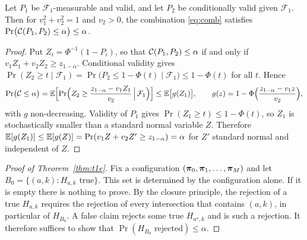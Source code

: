 \begin{appendix}
\begin{lemma}\label{lem:inv}
Let $P_1$ be $\mathcal F_1$-measurable and valid, and let $P_2$ be conditionally valid given $\mathcal F_1$. Then for $v_1^2+v_2^2=1$ and $v_2>0$, the combination \eqref{eq:comb} satisfies $\mathrm{Pr}\big(\mathcal{C}(P_1,P_2)\le\alpha\big)\le\alpha$.
\end{lemma}

\begin{proof}
Put $Z_i=\Phi^{-1}(1-P_i)$, so that $\mathcal{C}(P_1,P_2)\le\alpha$ if and only if $v_1Z_1+v_2Z_2\ge z_{1-\alpha}$. Conditional validity gives $\Pr(Z_2\ge t\mid\mathcal F_1)=\Pr\big(P_2\le1-\Phi(t)\mid\mathcal F_1\big)\le1-\Phi(t)$ for all $t$. Hence
\begin{equation*}
\mathrm{Pr}\big(\mathcal{C}\le\alpha\big)=\mathbb{E}\Big[\mathrm{Pr}\Big(Z_2\ge\frac{z_{1-\alpha}-v_1Z_1}{v_2}\,\Big|\,\mathcal F_1\Big)\Big]\le\mathbb{E}\big[g(Z_1)\big],\qquad g(z)=1-\Phi\Big(\frac{z_{1-\alpha}-v_1z}{v_2}\Big),
\end{equation*}
with $g$ non-decreasing. Validity of $P_1$ gives $\Pr(Z_1\ge t)\le1-\Phi(t)$, so $Z_1$ is stochastically smaller than a standard normal variable $Z$. Therefore $\mathbb{E}[g(Z_1)]\le\mathbb{E}[g(Z)]=\mathrm{Pr}(v_1Z+v_2Z'\ge z_{1-\alpha})=\alpha$ for $Z'$ standard normal and independent of $Z$.
\end{proof}

\begin{proof}[Proof of Theorem~\ref{thm:t1e}]
Fix a configuration $(\bm{\pi}_0,\bm{\pi}_1,\dots,\bm{\pi}_M)$ and let $B_0=\{(a,k):H_{a,k}\text{ true}\}$. This set is determined by the configuration alone. If it is empty there is nothing to prove. By the closure principle, the rejection of a true $H_{a,k}$ requires the rejection of every intersection that contains $(a,k)$, in particular of $H_{B_0}$. A false claim rejects some true $H_{a^\star,k}$ and is such a rejection. It therefore suffices to show that $\Pr(H_{B_0}\text{ rejected})\le\alpha$.


\end{proof}
\end{appendix}
